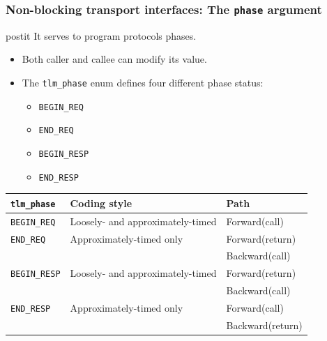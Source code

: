 {\begin{frame}
	\frametitle{\small Non-blocking transport interfaces: The \texttt{phase} argument}
	\vspace{0.4em}
	\begin{beamercolorbox}[center,rounded=true,wd=\textwidth]{postit}
		It serves to program protocols phases.
	\end{beamercolorbox}
	\begin{itemize}
		\item<1-> Both caller and callee can modify its value.
		\item The \texttt{tlm\_phase} enum defines four different phase status:
		\begin{itemize}
			\item<1-> \texttt{BEGIN\_REQ}
			\item<1-> \texttt{END\_REQ}
			\item<1-> \texttt{BEGIN\_RESP}
			\item<1-> \texttt{END\_RESP}
		\end{itemize}
	\end{itemize}
	\vspace{-0.9em}
	\begin{center}{
	\scriptsize
	\begin{tabular}{|l|l|l|}
		\hline
		\texttt{\textbf{tlm\_phase}} & \textbf{Coding style} & \textbf{Path} \\
		\hline
		\texttt{BEGIN\_REQ} & Loosely- and approximately-timed & Forward(call) \\
		\hline
		\texttt{END\_REQ} & Approximately-timed only & Forward(return) \\
		& & Backward(call) \\
		\hline
		\texttt{BEGIN\_RESP} & Loosely- and approximately-timed & Forward(return) \\
		& & Backward(call) \\
		\hline
		\texttt{END\_RESP} & Approximately-timed only & Forward(call) \\
		& & Backward(return) \\
		\hline
	\end{tabular}
	}
	\end{center}
\end{frame}

}
